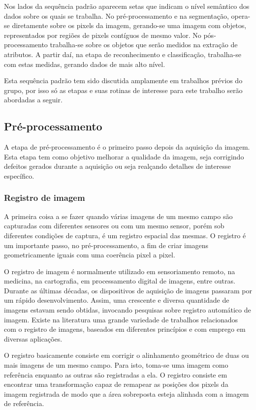 Nos lados da sequência padrão aparecem setas que indicam o nível
semântico dos dados sobre os quais se trabalha. No pré-processamento e
na segmentação, opera-se diretamente sobre os pixels da imagem,
gerando-se uma imagem com objetos, representados por regiões de pixels
contíguos de mesmo valor. No pós-processamento trabalha-se sobre os
objetos que serão medidos na extração de atributos. A partir daí, na
etapa de reconhecimento e classificação, trabalha-se com estas
medidas, gerando dados de mais alto nível.

Esta sequência padrão tem sido discutida amplamente em trabalhos
prévios do grupo, por isso só as etapas e suas rotinas de interesse
para este trabalho serão abordadas a seguir.\cite{35,52,72,73,74}

\subsection{Pré-processamento}

A etapa de pré-processamento é o primeiro passo depois da aquisição da
imagem. Esta etapa tem como objetivo melhorar a qualidade da imagem,
seja corrigindo defeitos gerados durante a aquisição ou seja realçando
detalhes de interesse específico.

\subsubsection{Registro de imagem}

A primeira coisa a se fazer quando várias imagens de um mesmo campo
são capturadas com diferentes sensores ou com um mesmo sensor, porém
sob diferentes condições de captura, é um registro espacial das
mesmas.\cite{75} O registro é um importante passo, no
pré-processamento, a fim de criar imagens geometricamente iguais com
uma coerência pixel a pixel.

O registro de imagem é normalmente utilizado em sensoriamento remoto,
na medicina, na cartografia, em processamento digital de imagens,
entre outras. Durante as últimas décadas, os dispositivos de aquisição
de imagens passaram por um rápido desenvolvimento. Assim, uma
crescente e diversa quantidade de imagens estavam sendo obtidas,
invocando pesquisas sobre registro automático de imagem.\cite{76}
Existe na literatura uma grande variedade de trabalhos relacionados
com o registro de imagens, baseados em diferentes princípios e com
emprego em diversas aplicações.\cite{75,76,77,78,79,80,81,82,83}

O registro basicamente consiste em corrigir o alinhamento geométrico
de duas ou mais imagens de um mesmo campo. Para isto, toma-se uma
imagem como referência enquanto as outras são registradas a ela. O
registro consiste em encontrar uma transformação capaz de remapear as
posições dos pixels da imagem registrada de modo que a área sobreposta
esteja alinhada com a imagem de referência.\cite{77}


